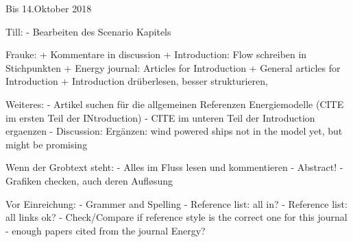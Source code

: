 Bis 14.Oktober 2018

Till:
- Bearbeiten des Scenario Kapitels

Frauke:
+ Kommentare in discussion
+ Introduction: Flow schreiben in Stichpunkten
+ Energy journal: Articles for Introduction
+ General articles for Introduction
+ Introduction drüberlesen, besser strukturieren, 

Weiteres:
- Artikel suchen für die allgemeinen Referenzen Energiemodelle (CITE im ersten Teil der INtroduction)
- CITE im unteren Teil der Introduction ergaenzen
- Discussion: Ergänzen: wind powered ships not in the model yet, but might be promising

Wenn der Grobtext steht:
- Alles im Fluss lesen und kommentieren
- Abstract!
- Grafiken checken, auch deren Aufløsung


Vor Einreichung:
- Grammer and Spelling
- Reference list: all in?
- Reference list: all links ok?
- Check/Compare if reference style is the correct one for this journal
- enough papers cited from the journal Energy?
